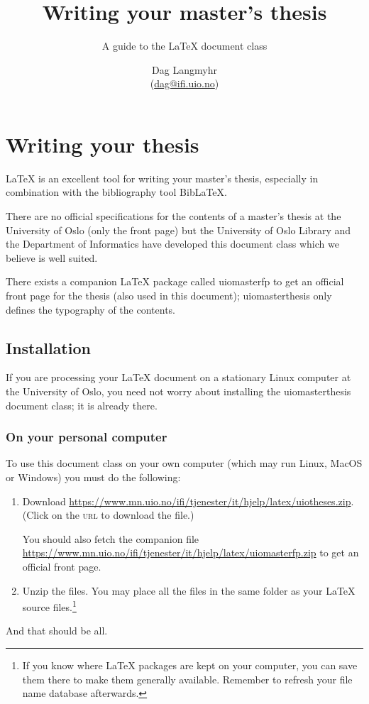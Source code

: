 \documentclass[UKenglish]{uiomasterthesis}
\title{Writing your master's thesis}
\subtitle{A guide to the \LaTeX{} document class \pb{uiomasterthesis}}
\author{Dag Langmyhr\\ (\url{dag@ifi.uio.no})}
\newcommand{\p}[1]{\textsf{#1}}
\begin{document}
\uiomasterfp[kind=Documentation, compact, nosp, colour=grey, date=\today]

\chapter{Writing your thesis}
\LaTeX{} is an excellent tool for writing your master's thesis, especially in
combination with the bibliography tool Bib\LaTeX.

There are no official specifications for the contents of a master's
thesis at the University of Oslo (only the front page) but 
the University of Oslo Library
and the Department of Informatics have developed this document class
which we believe is well suited.

There exists a companion \LaTeX{} package called \p{uiomasterfp} to
get an official front page for the thesis (also used in this
document);
\p{uiomasterthesis} only defines the typography of the contents.

\section{Installation}
If you are processing your \LaTeX{} document on a stationary Linux
computer at the University of Oslo, you need not worry about
installing the \p{uiomasterthesis} document class; it is already there.

\subsection{On your personal computer\label{privat-pc}}
To use this document class on your own computer (which may run Linux, MacOS
or Windows) you must do the following:
\begin{enumerate}
\item Download
  \url{https://www.mn.uio.no/ifi/tjenester/it/hjelp/latex/uiotheses.zip}. (Click
  on the \textsc{url} to download the file.)

  You should also fetch the companion file
  \url{https://www.mn.uio.no/ifi/tjenester/it/hjelp/latex/uiomasterfp.zip}
  to get an official front page.
  
\item Unzip the files. You may place all the files in the same folder
  as your \LaTeX{} source files.\footnote{If you know where \LaTeX{}
    packages are kept on your computer, you 
    can save them there to make them generally available. Remember to
    refresh your file name database afterwards.}
\end{enumerate}
And that should be all.
\end{document}
